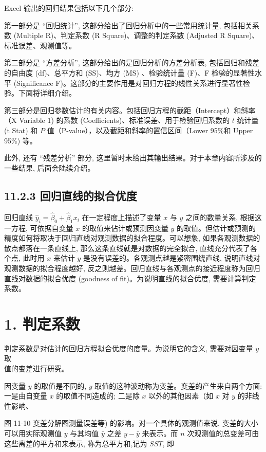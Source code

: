 \documentclass[10pt]{article}
\begin{document}
\begin{CJK*}{UTF8}{bsmi}
Excel 输出的回归结果包括以下几个部分:

第一部分是 “回归统计”, 这部分给出了回归分析中的一些常用统计量, 包括相关系数 (Multiple R)、判定系数 (R Square)、调整的判定系数 (Adjusted R Square)、标准误差、观测值等。

第二部分是 “方差分析”, 这部分给出的是回归分析的方差分析表, 包括回归和残差的自由度 (df)、总平方和 (SS)、均方 (MS) 、检验统计量 (F)、F 检验的显著性水平 (Significance F)。这部分的主要作用是对回归方程的线性关系进行显著性检验。下面将详细介绍。

第三部分是回归参数估计的有关内容。包括回归方程的截距（Intercept）和斜率（X Variable 1) 的系数 (Coefficients)、标准误差、用于检验回归系数的 $t$ 统计量 (t Stat) 和 $P$ 值（P-value），以及截距和斜率的置信区间（Lower 95\%和 Upper 95\%) 等。

此外, 还有 “残差分析” 部分, 这里暂时未给出其输出结果。对于本章内容所涉及的一些结果, 后面会陆续介绍。

\subsection*{11.2.3 回归直线的拟合优度}
回归直线 $\hat{y}_{i}=\hat{\beta}_{0}+\hat{\beta}_{1} x_{i}$ 在一定程度上描述了变量 $x$ 与 $y$ 之间的数量关系, 根据这一方程, 可依据自变量 $x$ 的取值来佔计或预测因变量 $y$ 的取值。但估计或预测的精度如何将取决于回归直线对观测数据的拟合程度。可以想象, 如果各观测数据的散点都落在一条直线上, 那么这条直线就是对数据的完全拟合, 直线充分代表了各个点, 此时用 $x$ 来估计 $y$ 是没有误差的。各观测点越是紧密围绕直线, 说明直线对观测数据的拟合程度越好, 反之则越差。回归直线与各观测点的接近程度称为回归直线对数据的拟合优度 (goodness of fit)。为说明直线的拟合优度, 需要计算判定系数。

\section*{1. 判定系数}
判定系数是对估计的回归方程拟合优度的度量。为说明它的含义, 需要对因变量 $y$ 取\\
值的变差进行研究。

因变量 $y$ 的取值是不同的, $y$ 取值的这种波动称为变差。变差的产生来自两个方面:一是由自变量 $x$ 的取值不同造成的; 二是除 $x$ 以外的其他因素（如 $x$ 对 $y$ 的非线性影响、

\begin{center}
\end{center}

图 11-10 变差分解图测量误差等) 的影响。对一个具体的观测值来说, 变差的大小可以用实际观测值 $y$ 与其均值 $\bar{y}$ 之差 $y-\bar{y}$ 来表示。而 $n$ 次观测值的总变差可由这些离差的平方和来表示, 称为总平方和,记为 $S S T$, 即



\end{CJK*}
\end{document}
